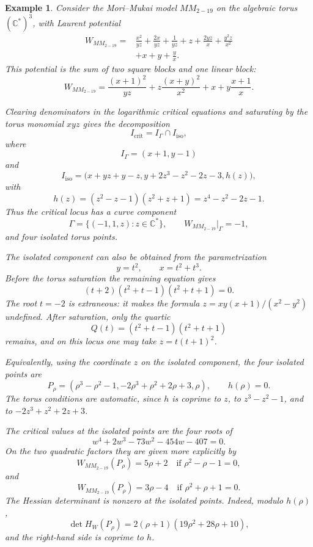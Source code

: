 \documentclass[11pt]{amsart}
\newtheorem{example}{Example}[section]
\begin{document}
\begin{example}
Consider the Mori--Mukai model $MM_{2-19}$ on the algebraic torus
$(\mathbb{C}^*)^3$, with Laurent potential
\begin{align*}
W_{MM_{2-19}}={}&\frac{x^2}{yz}+\frac{2x}{yz}+\frac{1}{yz}
+z+\frac{2yz}{x}+\frac{y^2z}{x^2} \\
&+x+y+\frac{y}{x}.
\end{align*}
This potential is the sum of two square blocks and one linear block:
\[
W_{MM_{2-19}}
=\frac{(x+1)^2}{yz}+z\frac{(x+y)^2}{x^2}
+x+y\frac{x+1}{x}.
\]

Clearing denominators in the logarithmic critical equations and saturating by
the torus monomial $xyz$ gives the decomposition
\[
I_{\mathrm{crit}}=I_{\Gamma}\cap I_{\mathrm{iso}},
\]
where
\[
I_{\Gamma}=(x+1,y-1)
\]
and
\[
I_{\mathrm{iso}}=\bigl(
x+yz+y-z,
y+2z^3-z^2-2z-3,
h(z)
\bigr),
\]
with
\[
h(z)=(z^2-z-1)(z^2+z+1)=z^4-z^2-2z-1.
\]
Thus the critical locus has a curve component
\[
\Gamma=\{(-1,1,z):z\in\mathbb{C}^*\},
\qquad
W_{MM_{2-19}}|_{\Gamma}=-1,
\]
and four isolated torus points.

The isolated component can also be obtained from the parametrization
\[
y=t^2,
\qquad
x=t^2+t^3.
\]
Before the torus saturation the remaining equation gives
\[
(t+2)(t^2+t-1)(t^2+t+1)=0.
\]
The root $t=-2$ is extraneous: it makes the formula
$z=xy(x+1)/(x^2-y^2)$ undefined. After saturation, only the quartic
\[
Q(t)=(t^2+t-1)(t^2+t+1)
\]
remains, and on this locus one may take $z=t(t+1)^2$.

Equivalently, using the coordinate $z$ on the isolated component, the four
isolated points are
\[
P_{\rho}=\left(
\rho^3-\rho^2-1,
-2\rho^3+\rho^2+2\rho+3,
\rho
\right),
\qquad
h(\rho)=0.
\]
The torus conditions are automatic, since $h$ is coprime to $z$, to
$z^3-z^2-1$, and to $-2z^3+z^2+2z+3$.

The critical values at the isolated points are the four roots of
\[
w^4+2w^3-73w^2-454w-407=0.
\]
On the two quadratic factors they are given more explicitly by
\[
W_{MM_{2-19}}(P_{\rho})=5\rho+2
\quad\text{if }\rho^2-\rho-1=0,
\]
and
\[
W_{MM_{2-19}}(P_{\rho})=3\rho-4
\quad\text{if }\rho^2+\rho+1=0.
\]
The Hessian determinant is nonzero at the isolated points. Indeed, modulo
$h(\rho)$,
\[
\det H_W(P_{\rho})=2(\rho+1)(19\rho^2+28\rho+10),
\]
and the right-hand side is coprime to $h$.


\end{example}
\end{document}
